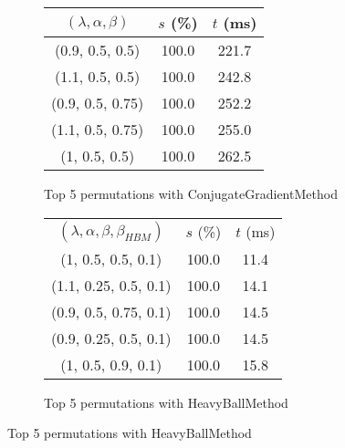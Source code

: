 \begin{figure}[H]
\begin{subfigure}[ht]{.5\textwidth}
\begin{tabular}{|c|c|c|}
\hline
\rowcolor{gray!25}
$(\lambda,\alpha,\beta)$ & $s$ (\%) & $t$ (ms) \\
\hline
(0.9, 0.5, 0.5) & 100.0 & 221.7 \\
(1.1, 0.5, 0.5) & 100.0 & 242.8 \\
(0.9, 0.5, 0.75) & 100.0 & 252.2 \\
(1.1, 0.5, 0.75) & 100.0 & 255.0 \\
(1, 0.5, 0.5) & 100.0 & 262.5 \\
\hline
\end{tabular}
\caption{Top 5 permutations with ConjugateGradientMethod}
\label{subfig:param_comp_NegativeEntropy_ConjugateGradientMethod_ArmijoSearch}
\end{subfigure}
\hfill
\begin{subfigure}[ht]{.5\textwidth}
\begin{tabular}{|c|c|c|}
\hline
\rowcolor{gray!25}
\multicolumn{3}{|c|}{HeavyBallMethod} \\
\hline
\rowcolor{gray!25}
$(\lambda,\alpha,\beta,\beta_{HBM})$ & $s$ (\%) & $t$ (ms) \\
\hline
(1, 0.5, 0.5, 0.1) & 100.0 & 11.4 \\
(1.1, 0.25, 0.5, 0.1) & 100.0 & 14.1 \\
(0.9, 0.5, 0.75, 0.1) & 100.0 & 14.5 \\
(0.9, 0.25, 0.5, 0.1) & 100.0 & 14.5 \\
(1, 0.5, 0.9, 0.1) & 100.0 & 15.8 \\
\hline
\end{tabular}
\caption{Top 5 permutations with HeavyBallMethod}
\label{subfig:param_comp_NegativeEntropy_HeavyBallMethod_ArmijoSearch}
\end{subfigure}
\end{figure}